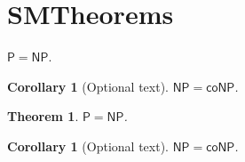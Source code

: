 \documentclass[class=scrartcl,crop=false]{standalone}
\newtheorem {corollary}     [theorem]     {Corollary}
\theoremstyle{nonumber}
\newtheorem* {theorem*}         {Theorem}
\newtheorem* {corollary*}       {Corollary}
\theoremstyle{withnumber}
\begin{document}
\section{SMTheorems}

\begin{theorem}
    $\mathsf{P} = \mathsf{NP}$.
\end{theorem}

\begin{corollary}[Optional text]
    $\mathsf{NP} = \mathsf{coNP}$.
\end{corollary}

\begin{theorem*}
    $\mathsf{P} = \mathsf{NP}$.
\end{theorem*}

\begin{corollary*}[Optional text]
    $\mathsf{NP} = \mathsf{coNP}$.
\end{corollary*}
\end{document}
